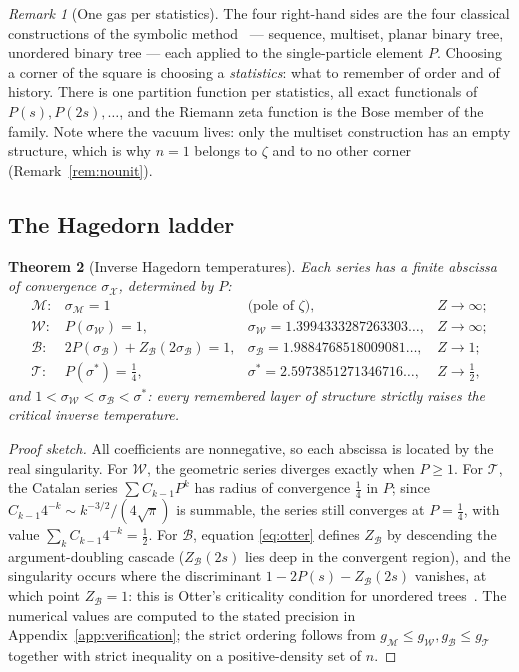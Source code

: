 \documentclass[11pt]{article}
\newcommand{\cT}{\mathcal{T}}   %
\newcommand{\cW}{\mathcal{W}}   %
\newcommand{\cB}{\mathcal{B}}   %
\newcommand{\cM}{\mathcal{M}}   %
\numberwithin{equation}{section}
\theoremstyle{plain}
\newtheorem{theorem}{Theorem}[section]
\theoremstyle{definition}
\theoremstyle{remark}
\newtheorem{remark}[theorem]{Remark}
\begin{document}
\begin{remark}[One gas per statistics]\label{rem:species}
The four right-hand sides are the four classical constructions of the symbolic
method~\cite{flajolet} --- sequence, multiset, planar binary tree, unordered binary
tree --- each applied to the single-particle element $P$. Choosing a corner of the
square is choosing a \emph{statistics}: what to remember of order and of history.
There is one partition function per statistics, all exact functionals of
$P(s), P(2s), \dots$, and the Riemann zeta function is the Bose member of the family.
Note where the vacuum lives: only the multiset construction has an empty structure,
which is why $n=1$ belongs to $\zeta$ and to no other corner
(Remark~\ref{rem:nounit}).
\end{remark}

\subsection{The Hagedorn ladder}

\begin{theorem}[Inverse Hagedorn temperatures]\label{thm:ladder}
Each series has a finite abscissa of convergence $\sigma_{\mathcal X}$, determined by
$P$:
\[
\begin{array}{llll}
\cM: & \sigma_\cM = 1 & \text{(pole of } \zeta), & Z \to \infty; \\[0.5mm]
\cW: & P(\sigma_\cW) = 1, & \sigma_\cW = 1.3994333287263303\dots, & Z \to \infty; \\[0.5mm]
\cB: & 2P(\sigma_\cB) + Z_\cB(2\sigma_\cB) = 1, & \sigma_\cB = 1.9884768518009081\dots, & Z \to 1; \\[0.5mm]
\cT: & P(\sigma^{*}) = \tfrac14, & \sigma^{*} = 2.5973851271346716\dots, & Z \to \tfrac12,
\end{array}
\]
and $1 < \sigma_\cW < \sigma_\cB < \sigma^{*}$: every remembered layer of structure
strictly raises the critical inverse temperature.
\end{theorem}

\begin{proof}[Proof sketch]
All coefficients are nonnegative, so each abscissa is located by the real singularity.
For $\cW$, the geometric series diverges exactly when $P \ge 1$. For $\cT$, the
Catalan series $\sum C_{k-1}P^k$ has radius of convergence $\tfrac14$ in $P$; since
$C_{k-1}4^{-k} \sim k^{-3/2}/(4\sqrt{\pi})$ is summable, the series still converges at
$P = \tfrac14$, with value $\sum_k C_{k-1}4^{-k} = \tfrac12$. For $\cB$, equation
\eqref{eq:otter} defines $Z_\cB$ by descending the argument-doubling cascade
($Z_\cB(2s)$ lies deep in the convergent region), and the singularity occurs where the
discriminant $1 - 2P(s) - Z_\cB(2s)$ vanishes, at which point $Z_\cB = 1$: this is
Otter's criticality condition for unordered trees~\cite{otter,flajolet}. The numerical
values are computed to the stated precision in Appendix~\ref{app:verification}; the
strict ordering follows from $g_\cM \le g_\cW, g_\cB \le g_\cT$ together with strict
inequality on a positive-density set of $n$.
\end{proof}
\end{document}

